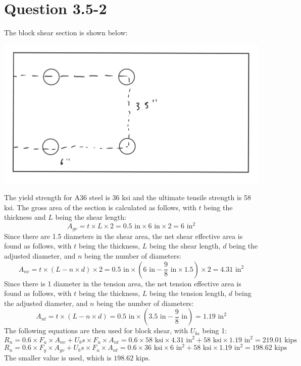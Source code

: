 \documentclass{article}
\begin{document}
\section*{Question 3.5-2}
The block shear section is shown below: 
\begin{center}
    \includegraphics*[scale=0.3]{fig2.png} 
\end{center}
The yield strength for A36 steel is 36 ksi and the ultimate tensile strength is 58 ksi. The gross area of the section is calculated as follows, with $t$ being the thickness and $L$ being the shear length: 
\[A_{gv}=t\times L\times 2=0.5\text{ in}\times 6\text{ in}\times2=6\text{ in}^2\] 
Since there are 1.5 diameters in the shear area, the net shear effective area is found as follows, with $t$ being the thickness, $L$ being the shear length, $d$ being the adjusted diameter, and $n$ being the number of diameters: 
\[A_{nv}=t\times(L-n\times d)\times 2=0.5\text{ in}\times\left(6\text{ in}-\frac{9}{8}\text{ in}\times 1.5 \right)\times 2=4.31\text{ in}^2\] 
Since there is 1 diameter in the tension  area, the net tension effective area is found as follows, with $t$ being the thickness, $L$ being the tension length, $d$ being the adjusted diameter, and $n$ being the number of diameters: 
\[A_{nt}=t\times(L-n\times d)=0.5\text{ in}\times\left(3.5\text{ in}-\frac{9}{8}\text{ in}\right)=1.19\text{ in}^2\] 
The following equations are then used for block shear, with $U_{bs}$ being 1: 
\[R_n = 0.6\times F_u\times A_{nv}+U_bs\times F_u\times A_{nt}=0.6\times 58\text{ ksi}\times4.31\text{ in}^2+58\text{ ksi}\times 1.19\text{ in}^2=219.01\text{ kips}\] 
\[R_n=0.6\times F_y\times A_{gv}+U_bs\times F_u\times A_{nt}=0.6\times 36\text{ ksi}\times 6\text{ in}^2+58\text{ ksi}\times 1.19\text{ in}^2=198.62\text{ kips}\]
The smaller value is used, which is $\boxed{198.62\text{ kips}}$.
\newpage
\end{document}
